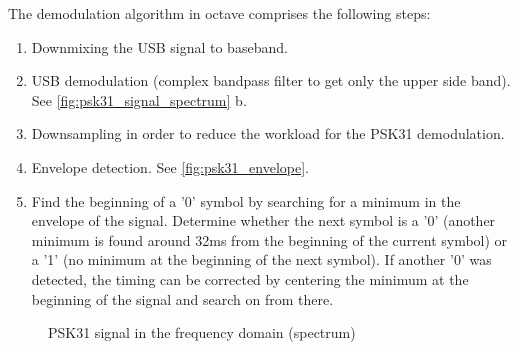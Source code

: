 The demodulation algorithm in octave comprises the following steps:
\begin{enumerate}
	\item Downmixing the \ac{USB} signal to baseband.
	\item \ac{USB} demodulation (complex bandpass filter to
		get only the upper side band). See \autoref{fig:psk31_signal_spectrum} b.
	\item Downsampling in order to reduce the workload for the PSK31 demodulation.
	\item Envelope detection. See \autoref{fig:psk31_envelope}.
	\item Find the beginning of a '0' symbol by searching for a minimum in the
		envelope of the signal. Determine whether the next symbol is a '0' (another
		minimum is found around 32ms from the beginning of the current symbol) or
		a '1' (no minimum at the beginning of the next symbol). If another '0' was
		detected, the timing can be corrected by centering the minimum at the beginning
		of the signal and search on from there.
\end{enumerate}

\begin{figure}

\caption{PSK31 signal in the frequency domain (spectrum)}
\label{fig:psk31_signal_spectrum}
\end{figure}

